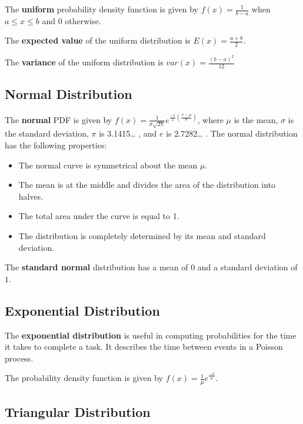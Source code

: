 \documentclass[
  letterpaper,
  DIV=11,
  numbers=noendperiod]{scrreprt}
\begin{document}
The \textbf{uniform} probability density function is given by
\(f(x)= \frac {1}{b-a}\) when \(a \leq x \leq b\) and \(0\) otherwise.

The \textbf{expected value} of the uniform distribution is
\(E(x)= \frac {a+b}{2}\).

The \textbf{variance} of the uniform distribution is
\(var(x)= \frac {(b-a)^2} {12}\)

\hypertarget{normal-distribution}{%
\subsection*{Normal Distribution}\label{normal-distribution}}

The \textbf{normal} PDF is given by
\(f(x)= \frac {1}{\sigma \sqrt{2\pi}} e^{\frac {-1}{2} (\frac {x-\mu}{\sigma})}\),
where \(\mu\) is the mean, \(\sigma\) is the standard deviation, \(\pi\)
is 3.1415\ldots{} , and \(e\) is 2.7282\ldots{} . The normal
distribution has the following properties:

\begin{itemize}
\item
  The normal curve is symmetrical about the mean \(\mu\).
\item
  The mean is at the middle and divides the area of the distribution
  into halves.
\item
  The total area under the curve is equal to 1.
\item
  The distribution is completely determined by its mean and standard
  deviation.
\end{itemize}

The \textbf{standard normal} distribution has a mean of \(0\) and a
standard deviation of \(1\).

\hypertarget{exponential-distribution}{%
\subsection*{Exponential Distribution}\label{exponential-distribution}}

The \textbf{exponential distribution} is useful in computing
probabilities for the time it takes to complete a task. It describes the
time between events in a Poisson process.

The probability density function is given by
\(f(x)=\frac {1}{\mu}e^{ \frac {-x}{\mu}}\).

\hypertarget{triangular-distribution}{%
\subsection*{Triangular Distribution}\label{triangular-distribution}}
\end{document}
